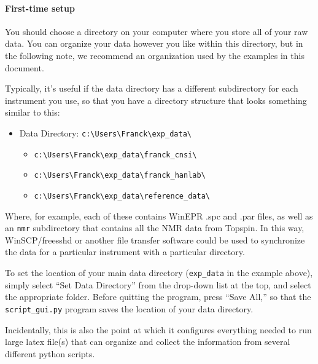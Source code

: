 \paragraph{First-time setup}
You should choose a directory
    on your computer
    where you store all of your raw data. 
You can organize your data however you like within this directory,
    but in the following note,
    we recommend an organization
    used by the examples in this document.
\begin{inplacenotebox}
    Typically, it's useful if the data directory
        has a different subdirectory for
        each instrument you use,
        so that you have a directory structure that
        looks something similar to this:
    \begin{itemize}
        \item Data Directory: \verb|c:\Users\Franck\exp_data\|
            \begin{itemize}
                \item \verb|c:\Users\Franck\exp_data\franck_cnsi\|
                \item \verb|c:\Users\Franck\exp_data\franck_hanlab\|
                \item \verb|c:\Users\Franck\exp_data\reference_data\|
            \end{itemize}
    \end{itemize}
    Where, for example, each of these contains WinEPR .spc and .par files,
        as well as an \verb|nmr| subdirectory that contains all
        the NMR data from Topspin.
    In this way, WinSCP/freesshd or another
        file transfer software could be used to synchronize the
        data for a particular instrument with a particular
        directory.
\end{inplacenotebox}
To set the location of your main data directory
    (\texttt{exp\_data} in the example above),
    simply select ``Set Data Directory'' from the drop-down list
    at the top,
    and select the appropriate folder.
Before quitting the program, press ``Save All,''
    so that the \texttt{script\_gui.py} program
    saves the location of your data directory.
    \begin{inplacenotebox}
        Incidentally, this is also the point at which it configures
            everything needed to run large latex file(s)
            that can organize and collect the information from
            several different python scripts.
    \end{inplacenotebox}
